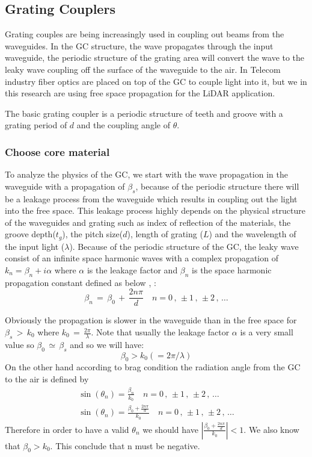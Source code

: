 \documentclass{article}
\begin{document}
\subsection{Grating Couplers}
\label{gratingCouples}

Grating couples are being increasingly used in coupling out beams from the waveguides. In the GC structure, the wave propagates through the input waveguide, the periodic structure of the grating area will convert the wave to the leaky wave coupling off the surface of the waveguide to the air. In Telecom industry fiber optics are placed on top of the GC to couple light into it, but we in this research are using free space propagation for the LiDAR application.

The basic grating coupler is a periodic structure of teeth and groove with a grating period of $d$ and the coupling angle of $\theta.$ \cite{pub2000}

\subsubsection{Choose core material}
\label{core}
To analyze the physics of the GC, we start with the wave propagation in the waveguide with a propagation of $\beta_{s}$, because of the periodic structure there will be a leakage process from the waveguide which results in coupling out the light into the free space. This leakage process highly depends on the physical structure of the waveguides and grating such as index of reflection of the materials, the groove depth($t_g$), the pitch size($d$), length of grating ($L$) and the wavelength of the input light ($\lambda $). Because of the periodic structure of the GC, the leaky wave consist of an infinite space harmonic waves with a complex propagation of $k_n= \beta_n + i\alpha$ where $\alpha$ is the leakage factor and $\beta_n$ is the space harmonic propagation constant defined as below \cite{oe241821027beamwidth}, \cite{tamirPeng1977}:
\begin{equation}
\beta_n \, = \, \beta_0 \, + \, \frac{2n\pi}{d} \quad n=0 \, , \,  \pm1 \, , \, \pm2 \, , \, \dots
\end{equation}

Obviously the propagation is slower in the waveguide than in the free space for $\beta_s \, > \, k_0 $ where $k_0 \, =  \, \frac{2\pi}{\lambda}$.  Note that usually the leakage factor $\alpha$ is a very small value so $\beta_0 \, \simeq \, \beta_s$ and so we will have:
\begin{equation}
\beta_0 > k_0 (=2\pi / \lambda)
\end{equation}
On the other hand according to brag condition the radiation angle from the GC to the air is defined by
\begin{eqnarray}
\nonumber \sin(\theta_n)=\frac{\beta_n}{k_0} \quad n=0 \, , \,  \pm1 \, , \, \pm2 \, , \, \dots  \\
\sin(\theta_n)=\frac{\beta_0 +\frac{2n\pi}{d}}{k_0}\quad n=0 \, , \,  \pm1 \, , \, \pm2 \, , \, \dots  
\end{eqnarray}
Therefore in order to have a valid $\theta_n$ we should have $|\frac{\beta_0 +\frac{2n\pi}{d}}{k_0}| <1$. We also know that $\beta_0 > k_0$. This conclude that n must be negative.
\end{document}
